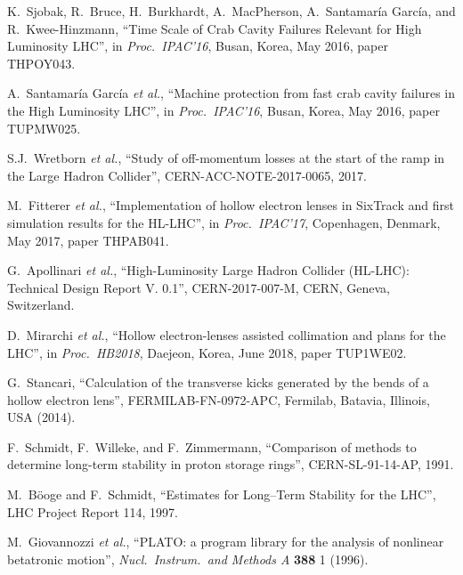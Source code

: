 \documentclass[a4paper,
              ]{jacow}
\begin{document}
\begin{thebibliography}{99}
K.~Sjobak, R.~Bruce, H.~Burkhardt, A.~MacPherson, A.~Santamaría García, and R.~Kwee-Hinzmann, ``Time Scale of Crab Cavity Failures Relevant for High Luminosity LHC'', in {\it Proc.~IPAC’16}, Busan, Korea, May 2016, paper THPOY043.

A.~Santamaría García {\it et al.},
``Machine protection from fast crab cavity failures in the High Luminosity LHC'', in {\it Proc.~IPAC’16}, Busan, Korea, May 2016, paper TUPMW025.
 
S.J.\ Wretborn {\it et al.}, ``Study of off-momentum losses at the start of the ramp in the Large Hadron Collider'', CERN-ACC-NOTE-2017-0065, 2017.

M.~Fitterer {\it et al.},
``Implementation of hollow electron lenses in SixTrack and first simulation results for the HL-LHC'', in {\it Proc.~IPAC’17}, Copenhagen, Denmark, May 2017, paper THPAB041.

G.~Apollinari  {\it et al.}, ``High-Luminosity Large Hadron Collider (HL-LHC):
Technical Design Report V. 0.1'', CERN-2017-007-M, CERN, Geneva, Switzerland.

D.~Mirarchi {\it et al.},
``Hollow electron-lenses assisted collimation and plans for the LHC'', in {\it Proc.~HB2018}, Daejeon, Korea, June 2018, paper TUP1WE02.

G.~Stancari, ``Calculation of the transverse kicks generated by the bends of a hollow
electron lens'', FERMILAB-FN-0972-APC, Fermilab, Batavia, Illinois, USA (2014).


F.~Schmidt, F.~Willeke, and F.~Zimmermann, ``Comparison of methods to determine long-term stability in proton storage rings'', CERN-SL-91-14-AP, 1991. 

M.~B\"ooge and F.~Schmidt, ``{Estimates for Long–Term Stability for the LHC}'', LHC Project Report 114, 1997.

M.~Giovannozzi {\it et al.}, ``PLATO: a program library for the analysis of nonlinear betatronic motion'', {\it Nucl.\ Instrum.\ and Methods A} {\bf 388} 1 (1996).


\end{thebibliography}
\end{document}
